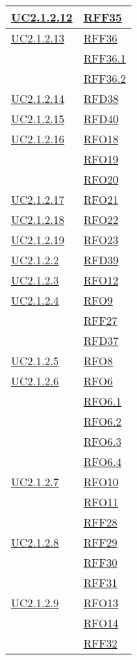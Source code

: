 \begin{longtable}{|>{\centering}m{5cm}|m{5cm}<{\centering}|}
	\hyperlink{UC2.1.2.12}{UC2.1.2.12} & \hyperlink{RFF35}{RFF35}\\ \hline
	\hyperlink{UC2.1.2.13}{UC2.1.2.13} & \hyperlink{RFF36}{RFF36}\\
	& \hyperlink{RFF36.1}{RFF36.1}\\
	& \hyperlink{RFF36.2}{RFF36.2}\\ \hline
	\hyperlink{UC2.1.2.14}{UC2.1.2.14} & \hyperlink{RFD38}{RFD38}\\ \hline
	\hyperlink{UC2.1.2.15}{UC2.1.2.15} & \hyperlink{RFD40}{RFD40}\\ \hline
	\hyperlink{UC2.1.2.16}{UC2.1.2.16} & \hyperlink{RFO18}{RFO18}\\
	& \hyperlink{RFO19}{RFO19}\\
	& \hyperlink{RFO20}{RFO20}\\ \hline
	\hyperlink{UC2.1.2.17}{UC2.1.2.17} & \hyperlink{RFO21}{RFO21}\\ \hline
	\hyperlink{UC2.1.2.18}{UC2.1.2.18} & \hyperlink{RFO22}{RFO22}\\ \hline
	\hyperlink{UC2.1.2.19}{UC2.1.2.19} & \hyperlink{RFO23}{RFO23}\\ \hline
	\hyperlink{UC2.1.2.2}{UC2.1.2.2} & \hyperlink{RFD39}{RFD39}\\ \hline
	\hyperlink{UC2.1.2.3}{UC2.1.2.3} & \hyperlink{RFO12}{RFO12}\\ \hline
	\hyperlink{UC2.1.2.4}{UC2.1.2.4} & \hyperlink{RFO9}{RFO9}\\
	& \hyperlink{RFF27}{RFF27}\\
	& \hyperlink{RFD37}{RFD37}\\ \hline
	\hyperlink{UC2.1.2.5}{UC2.1.2.5} & \hyperlink{RFO8}{RFO8}\\ \hline
	\hyperlink{UC2.1.2.6}{UC2.1.2.6} & \hyperlink{RFO6}{RFO6}\\
	& \hyperlink{RFO6.1}{RFO6.1}\\
	& \hyperlink{RFO6.2}{RFO6.2}\\
	& \hyperlink{RFO6.3}{RFO6.3}\\
	& \hyperlink{RFO6.4}{RFO6.4}\\ \hline
	\hyperlink{UC2.1.2.7}{UC2.1.2.7} & \hyperlink{RFO10}{RFO10}\\
	& \hyperlink{RFO11}{RFO11}\\
	& \hyperlink{RFF28}{RFF28}\\ \hline
	\hyperlink{UC2.1.2.8}{UC2.1.2.8} & \hyperlink{RFF29}{RFF29}\\
	& \hyperlink{RFF30}{RFF30}\\
	& \hyperlink{RFF31}{RFF31}\\ \hline
	\hyperlink{UC2.1.2.9}{UC2.1.2.9} & \hyperlink{RFO13}{RFO13}\\
	& \hyperlink{RFO14}{RFO14}\\
	& \hyperlink{RFF32}{RFF32}\\ \hline


\end{longtable}
